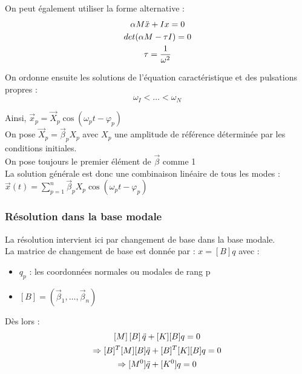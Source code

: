 \documentclass[../main.tex]{subfiles}
\begin{document}
On peut également utiliser la forme alternative : \begin{equation}
    \begin{gathered}
        \alpha M \Ddot{x} + Ix = 0\\
        det(\alpha M - \tau I)=0\\
        \tau = \frac{1}{\omega^2}\\
    \end{gathered}
\end{equation}

On ordonne ensuite les solutions de l'équation caractéristique et des pulsations propres : \begin{equation}
    \omega_I<\dots <\omega_N
\end{equation}

Ainsi, $\Vec{x}_p = \Vec{X}_p \cos(\omega_pt-\varphi_p)$\\

On pose $\Vec{X}_p = \Vec{\beta}_pX_p$ avec $X_p$ une amplitude de référence déterminée par les conditions initiales.\\

\warning On pose toujours le premier élément de $\Vec{\beta}$ comme 1\\

La solution générale est donc une combinaison linéaire de tous les modes : $\Vec{x}(t) = \sum_{p=1}^n \Vec{\beta}_pX_p \cos(\omega_pt-\varphi_p)$\\

\subsubsection{Résolution dans la base modale}

La résolution intervient ici par changement de base dans la base modale.\\

La matrice de changement de base est donnée par : $x = [B]q$ avec : \begin{itemize}
    \item $q_p$ : les coordonnées normales ou modales de rang p\\
    \item $[B] = (\Vec{\beta}_1, \dots, \Vec{\beta}_n)$ \\
\end{itemize}

Dès lors : \begin{equation}
    \begin{gathered}
        \left[M \right] \left[B\right]\Ddot{q} + [K][B]q = 0\\
        \Rightarrow [B]^T[M][B]\Ddot{q} + [B]^T[K][B]q = 0\\
        \Rightarrow [M^0] \Ddot{q} + [K^0]q = 0\\
    \end{gathered}
\end{equation}
\end{document}
